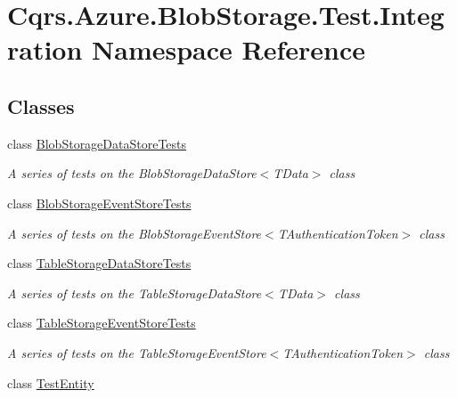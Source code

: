 \hypertarget{namespaceCqrs_1_1Azure_1_1BlobStorage_1_1Test_1_1Integration}{}\section{Cqrs.\+Azure.\+Blob\+Storage.\+Test.\+Integration Namespace Reference}
\label{namespaceCqrs_1_1Azure_1_1BlobStorage_1_1Test_1_1Integration}
\subsection*{Classes}
\begin{DoxyCompactItemize}
\item 
class \hyperlink{classCqrs_1_1Azure_1_1BlobStorage_1_1Test_1_1Integration_1_1BlobStorageDataStoreTests}{Blob\+Storage\+Data\+Store\+Tests}
\begin{DoxyCompactList}\small\item\em A series of tests on the Blob\+Storage\+Data\+Store$<$\+T\+Data$>$ class \end{DoxyCompactList}\item 
class \hyperlink{classCqrs_1_1Azure_1_1BlobStorage_1_1Test_1_1Integration_1_1BlobStorageEventStoreTests}{Blob\+Storage\+Event\+Store\+Tests}
\begin{DoxyCompactList}\small\item\em A series of tests on the Blob\+Storage\+Event\+Store$<$\+T\+Authentication\+Token$>$ class \end{DoxyCompactList}\item 
class \hyperlink{classCqrs_1_1Azure_1_1BlobStorage_1_1Test_1_1Integration_1_1TableStorageDataStoreTests}{Table\+Storage\+Data\+Store\+Tests}
\begin{DoxyCompactList}\small\item\em A series of tests on the Table\+Storage\+Data\+Store$<$\+T\+Data$>$ class \end{DoxyCompactList}\item 
class \hyperlink{classCqrs_1_1Azure_1_1BlobStorage_1_1Test_1_1Integration_1_1TableStorageEventStoreTests}{Table\+Storage\+Event\+Store\+Tests}
\begin{DoxyCompactList}\small\item\em A series of tests on the Table\+Storage\+Event\+Store$<$\+T\+Authentication\+Token$>$ class \end{DoxyCompactList}\item 
class \hyperlink{classCqrs_1_1Azure_1_1BlobStorage_1_1Test_1_1Integration_1_1TestEntity}{Test\+Entity}
\end{DoxyCompactItemize}
